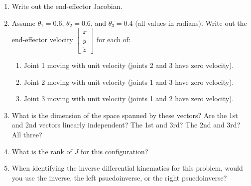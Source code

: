 \documentclass{16384_doc}
\begin{document}
\begin{questions}
\begin{enumerate} [label=\alph*.]
        \item \text{[1 point]} Write out the end-effector Jacobian.
        \begin{tcolorbox}[height=3cm]
        \end{tcolorbox}
        
        \item \text{[3 points]} Assume $\theta_1 = 0.6$, $\theta_2 = 0.6$, and $\theta_3 = 0.4$ (all
        values in radians). Write out the end-effector velocity $\begin{bmatrix} \dot x \\ \dot y \\ \dot z \end{bmatrix}$
        for each of:
        \begin{enumerate} [label=(\roman*)]
          \item Joint 1 moving with unit velocity (joints 2 and 3 have zero velocity).
          \item Joint 2 moving with unit velocity (joints 1 and 3 have zero velocity).
          \item Joint 3 moving with unit velocity (joints 1 and 2 have zero velocity).
        \end{enumerate}
        \begin{tcolorbox}[height=3cm]
        \end{tcolorbox}
        
        \item \text{[2 points]} What is the dimension of the space spanned by these vectors? Are
        the 1st and 2nd vectors linearly independent? The 1st and 3rd?  The 2nd
        and 3rd? All three?
        \begin{tcolorbox}[height=3cm]
        \end{tcolorbox}
        
        \item \text{[1 point]} What is the rank of $J$ for this configuration?
        \begin{tcolorbox}[height=3cm]
        \end{tcolorbox}
        
        \item \text{[2 points]} When identifying the inverse differential kinematics for this
        problem, would you use the inverse, the left psuedoinverse, or the right
        psuedoinverse?
        \begin{tcolorbox}[height=3cm]
        \end{tcolorbox}
    \end{enumerate}


\end{questions}
\end{document}
